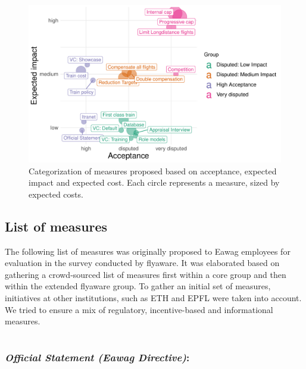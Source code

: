 \documentclass[]{tufte-handout}
\begin{document}
\begin{figure}
\includegraphics{final_report_files/figure-latex/unnamed-chunk-1-1} \caption[Categorization of measures proposed based on acceptance, expected impact and expected cost]{Categorization of measures proposed based on acceptance, expected impact and expected cost. Each circle represents a measure, sized by expected costs.}\label{fig:unnamed-chunk-1}
\end{figure}

\hypertarget{list-of-measures}{%
\subsection{List of measures}\label{list-of-measures}}

The following list of measures was originally proposed to Eawag
employees for evaluation in the survey conducted by flyaware. It was
elaborated based on gathering a crowd-sourced list of measures first
within a core group and then within the extended flyaware group. To
gather an initial set of measures, initiatives at other institutions,
such as ETH and EPFL were taken into account. We tried to ensure a mix
of regulatory, incentive-based and informational measures.

\hypertarget{official}{%
\section{}\label{official}}

\hypertarget{official-statement-eawag-directive}{%
\subsubsection{\texorpdfstring{\emph{Official Statement (Eawag
Directive)}:}{Official Statement (Eawag Directive):}}\label{official-statement-eawag-directive}}
\end{document}
